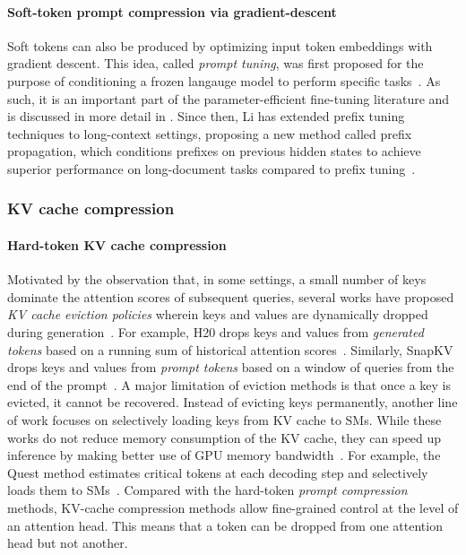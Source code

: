 \paragraph{Soft-token prompt compression via gradient-descent}
Soft tokens can also be produced by optimizing input token embeddings with gradient descent.
This idea, called \textit{prompt tuning}, was first proposed for the purpose of conditioning a frozen langauge model to perform specific tasks~\cite{lester2021power}.
As such, it is an important part of the parameter-efficient fine-tuning literature and is discussed in more detail in .
Since then, Li \etal has extended prefix tuning techniques to long-context settings, proposing a new method called prefix propagation, which conditions prefixes on previous hidden states to achieve superior performance on long-document tasks compared to prefix tuning~\cite{li2024mixlora}.
\subsubsection{KV cache compression}
\label{app:related-work-reducekv-kvcache}
\paragraph{Hard-token KV cache compression} Motivated by the observation that, in some settings, a small number of keys dominate the attention scores of subsequent queries, several works have proposed \textit{KV cache eviction policies} wherein keys and values are dynamically dropped during generation~\cite{ge2023model,zhang2023h2o,tang2024quest,oren2024transformers}. For example, H20 drops keys and values from \textit{generated tokens} based on a running sum of historical attention scores~\cite{zhang2023h2o}. Similarly, SnapKV drops keys and values from \textit{prompt tokens} based on a window of queries from the end of the prompt~\cite{li2024snapkv}.
A major limitation of eviction methods is that once a key is evicted, it cannot be recovered.
Instead of evicting keys permanently, another line of work focuses on selectively loading keys from KV cache to SMs.
While these works do not reduce memory consumption of the KV cache, they can speed up inference by making better use of GPU memory bandwidth~\cite{ribar2023sparq,tang2024quest}. For example, the Quest method estimates critical tokens at each decoding step and selectively loads them to SMs~\cite{tang2024quest}.
Compared with the hard-token \textit{prompt compression} methods, KV-cache compression methods allow fine-grained control at the level of an attention head. This means that a token can be dropped from one attention head but not another.
